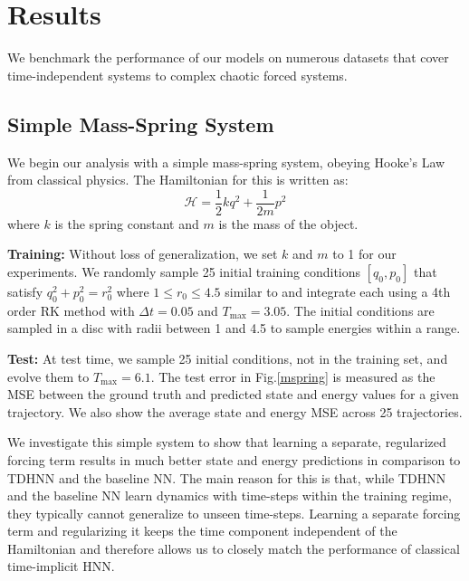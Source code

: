 \documentclass{article}
\begin{document}
\section{Results}

We benchmark the performance of our models on numerous datasets that cover time-independent systems to complex chaotic forced systems. 

\subsection{Simple Mass-Spring System}

We begin our analysis with a simple mass-spring system, obeying Hooke's Law from classical physics. The Hamiltonian for this is written as:
\begin{equation}
\mathcal{H} = \frac{1}{2}kq^2 + \frac{1}{2m}p^2 
\end{equation}
where $k$ is the spring constant and $m$ is the mass of the object. 

\textbf{Training:} Without loss of generalization, we set $k$ and $m$ to 1 for our experiments. We randomly sample 25 initial training conditions $[q_0,p_0]$ that satisfy $q_0^2+p_0^2 = r_0^2$ where $1 \leq r_0 \leq 4.5$ similar to \cite{greydanus_hamiltonian_2019} and integrate each using a 4th order RK method with $\Delta t =0.05$ and $T_{\max} = 3.05$. The initial conditions are sampled in a disc with radii between 1 and 4.5 to sample energies within a range.

\textbf{Test:} At test time, we sample 25 initial conditions, not in the training set, and evolve them to $T_{\max}=6.1$. The test error in Fig.\ref{mspring} is measured as the MSE between the ground truth and predicted state and energy values for a given trajectory. We also show the average state and energy MSE across 25 trajectories. 

We investigate this simple system to show that learning a separate, regularized forcing term results in much better state and energy predictions in comparison to TDHNN and the baseline NN. The main reason for this is that, while TDHNN and the baseline NN learn dynamics with time-steps within the training regime, they typically cannot generalize to unseen time-steps. Learning a separate forcing term and regularizing it keeps the time component independent of the Hamiltonian and therefore allows us to closely match the performance of classical time-implicit HNN.
\end{document}
